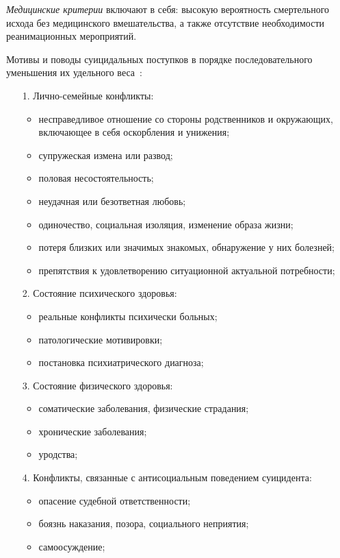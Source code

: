 \textit{Медицинские критерии} включают в себя: высокую вероятность смертельного исхода без медицинского вмешательства, а также отсутствие необходимости реанимационных мероприятий.~\cite{starsen}

Мотивы и поводы суицидальных поступков в порядке последовательного уменьшения их удельного веса~\cite{michlin}:

\begin{enumerate}
	\item[1.] Лично-семейные конфликты:
	\begin{itemize}
		\item несправедливое отношение со стороны родственников и окружающих, включающее в себя оскорбления и унижения;
		\item супружеская измена или развод;
		\item половая несостоятельность;
		\item неудачная или безответная любовь;
		\item одиночество, социальная изоляция, изменение образа жизни;
		\item потеря близких или значимых знакомых, обнаружение у них болезней;
		\item препятствия к удовлетворению ситуационной актуальной потребности;
	\end{itemize}

	\item[2.] Состояние психического здоровья:
	\begin{itemize}
		\item реальные конфликты психически больных;
		\item патологические мотивировки;
		\item постановка психиатрического диагноза;
	\end{itemize}

	\item[3.] Состояние физического здоровья:
	\begin{itemize}
		\item соматические заболевания, физические страдания;
		\item хронические заболевания;
		\item уродства;
	\end{itemize}

	\item[4.] Конфликты, связанные с антисоциальным поведением суицидента:
	\begin{itemize}
		\item опасение судебной ответственности;
		\item боязнь наказания, позора, социального неприятия;
		\item самоосуждение;
	\end{itemize}


\end{enumerate}
